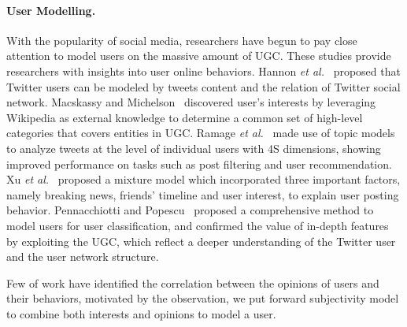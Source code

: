 \documentclass[twocolumn]{svjour3}          %
\begin{document}
\paragraph{User Modelling.}
With the popularity of social media, researchers have begun to pay close attention to model users on the massive amount of UGC. These studies provide researchers with insights into user online behaviors. 
Hannon \emph{et al.}~\cite{Hannon:2010} proposed that Twitter users can be modeled by tweets content and the relation of Twitter social network.
Macskassy and Michelson~\cite{conf/icwsm/MacskassyM11} discovered user's interests by leveraging Wikipedia as external knowledge to determine a common set of high-level categories that covers entities in UGC. 
Ramage \emph{et al.}~\cite{RamageEtAl:10} made use of topic models to analyze tweets at the level of individual users with 4S dimensions, showing improved performance on tasks such as post filtering and user recommendation. 
Xu \emph{et al.}~\cite{Xu:2012MUP} proposed a mixture model which incorporated three important factors, namely breaking news, friends' timeline and user interest, to explain user posting behavior.
Pennacchiotti and Popescu~\cite{Pennacchiotti:icwsm11} proposed a comprehensive method to model users for user classification, and confirmed the value of in-depth features by exploiting the UGC, which reflect a deeper understanding of the Twitter user and the user network structure.

Few of work have identified the correlation between the opinions of users and their behaviors, motivated by the observation, we put forward subjectivity model to combine both interests and opinions to model a user.
\end{document}
